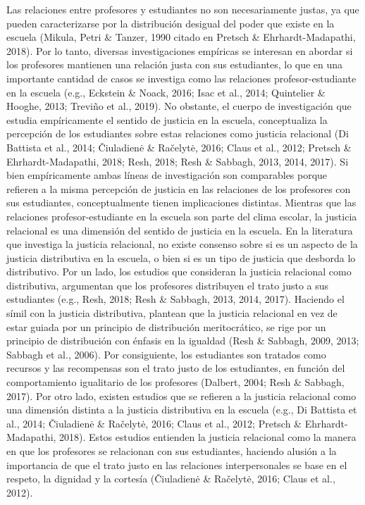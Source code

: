 \documentclass[12pt,twoside]{templates/facsothesis}
\begin{document}
Las relaciones entre profesores y estudiantes no son necesariamente justas, ya que pueden caracterizarse por la distribución desigual del poder que existe en la escuela (Mikula, Petri \& Tanzer, 1990 citado en Pretsch \& Ehrhardt-Madapathi, 2018). Por lo tanto, diversas investigaciones empíricas se interesan en abordar si los profesores mantienen una relación justa con sus estudiantes, lo que en una importante cantidad de casos se investiga como las relaciones profesor-estudiante en la escuela (e.g., Eckstein \& Noack, 2016; Isac et al., 2014; Quintelier \& Hooghe, 2013; Treviño et al., 2019). No obstante, el cuerpo de investigación que estudia empíricamente el sentido de justicia en la escuela, conceptualiza la percepción de los estudiantes sobre estas relaciones como justicia relacional (Di Battista et al., 2014; Čiuladienė \& Račelytė, 2016; Claus et al., 2012; Pretsch \& Ehrhardt-Madapathi, 2018; Resh, 2018; Resh \& Sabbagh, 2013, 2014, 2017). Si bien empíricamente ambas líneas de investigación son comparables porque refieren a la misma percepción de justicia en las relaciones de los profesores con sus estudiantes, conceptualmente tienen implicaciones distintas. Mientras que las relaciones profesor-estudiante en la escuela son parte del clima escolar, la justicia relacional es una dimensión del sentido de justicia en la escuela.
En la literatura que investiga la justicia relacional, no existe consenso sobre si es un aspecto de la justicia distributiva en la escuela, o bien si es un tipo de justicia que desborda lo distributivo. Por un lado, los estudios que consideran la justicia relacional como distributiva, argumentan que los profesores distribuyen el trato justo a sus estudiantes (e.g., Resh, 2018; Resh \& Sabbagh, 2013, 2014, 2017). Haciendo el símil con la justicia distributiva, plantean que la justicia relacional en vez de estar guiada por un principio de distribución meritocrático, se rige por un principio de distribución con énfasis en la igualdad (Resh \& Sabbagh, 2009, 2013; Sabbagh et al., 2006). Por consiguiente, los estudiantes son tratados como recursos y las recompensas son el trato justo de los estudiantes, en función del comportamiento igualitario de los profesores (Dalbert, 2004; Resh \& Sabbagh, 2017). Por otro lado, existen estudios que se refieren a la justicia relacional como una dimensión distinta a la justicia distributiva en la escuela (e.g., Di Battista et al., 2014; Čiuladienė \& Račelytė, 2016; Claus et al., 2012; Pretsch \& Ehrhardt-Madapathi, 2018). Estos estudios entienden la justicia relacional como la manera en que los profesores se relacionan con sus estudiantes, haciendo alusión a la importancia de que el trato justo en las relaciones interpersonales se base en el respeto, la dignidad y la cortesía (Čiuladienė \& Račelytė, 2016; Claus et al., 2012).
\end{document}
